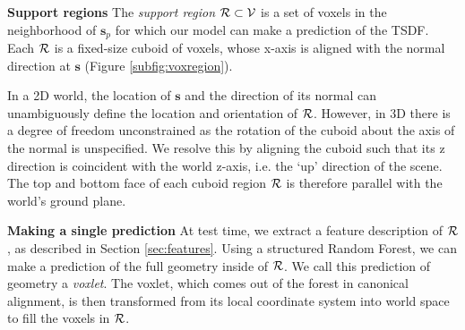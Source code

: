 \documentclass[10pt,twocolumn,letterpaper]{article}
\makeatletter
\renewcommand*{\ie}{i.e.\@\xspace}
\newcommand{\pixelidx}{\mathbf{s}}
\newcommand{\voxelgrid}{\mathcal{V}}
\newcommand{\project}{\mathbf{p}}
\newcommand{\todo}[1]{\textcolor{red}{TODO: #1}}
\renewcommand{\paragraph}{\vspace{2pt}\noindent\textbf}
\makeatother
\begin{document}



\paragraph{Support regions}
The \emph{support region} $\voxregion \subset \voxelgrid$ is a set of voxels in the neighborhood of $\pixelidx_p$ for which our model can make a prediction of the TSDF.
Each $\mathcal{R}$ is a fixed-size cuboid of voxels, whose x-axis is aligned with the normal direction at $\pixelidx$ (Figure \ref{subfig:voxregion}).

In a 2D world, the location of $\pixelidx$ and the direction of its normal can unambiguously define the location and orientation of $\mathcal{R}$.
However, in 3D there is a degree of freedom unconstrained as the rotation of the cuboid about the axis of the normal is unspecified.
We resolve this by aligning the cuboid such that its z direction is coincident with the world z-axis, \ie the `up' direction of the scene.
The top and bottom face of each cuboid region $\mathcal{R}$ is therefore parallel with the world's ground plane.


\paragraph{Making a single prediction}
At test time, we extract a feature description of $\mathcal{R}$, as described in Section \ref{sec:features}.
Using a structured Random Forest, we can make a prediction of the full geometry inside of $\mathcal{R}$.
We call this prediction of geometry a \emph{voxlet}.
The voxlet, which comes out of the forest in canonical alignment, is then transformed from its local coordinate system into world space to fill the voxels in $\mathcal{R}$.
\end{document}

